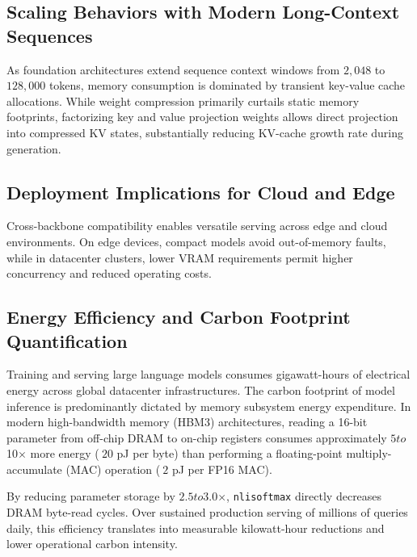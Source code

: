 \subsection{Scaling Behaviors with Modern Long-Context Sequences}
As foundation architectures extend sequence context windows from $2{,}048$ to $128{,}000$ tokens, memory consumption is dominated by transient key-value cache allocations. While weight compression primarily curtails static memory footprints, factorizing key and value projection weights allows direct projection into compressed KV states, substantially reducing KV-cache growth rate during generation.

\subsection{Deployment Implications for Cloud and Edge}
Cross-backbone compatibility enables versatile serving across edge and cloud environments. On edge devices, compact models avoid out-of-memory faults, while in datacenter clusters, lower VRAM requirements permit higher concurrency and reduced operating costs.

\subsection{Energy Efficiency and Carbon Footprint Quantification}
Training and serving large language models consumes gigawatt-hours of electrical energy across global datacenter infrastructures. The carbon footprint of model inference is predominantly dictated by memory subsystem energy expenditure. In modern high-bandwidth memory (HBM3) architectures, reading a 16-bit parameter from off-chip DRAM to on-chip registers consumes approximately $5$\times$ to $10$\times$ more energy ($~20$ pJ per byte) than performing a floating-point multiply-accumulate (MAC) operation ($~2$ pJ per FP16 MAC).

By reducing parameter storage by $2.5$\times$ to $3.0$\times$, \texttt{nlisoftmax} directly decreases DRAM byte-read cycles. Over sustained production serving of millions of queries daily, this efficiency translates into measurable kilowatt-hour reductions and lower operational carbon intensity.
